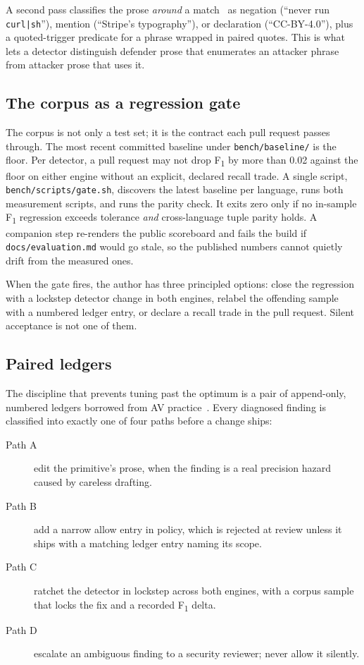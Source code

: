 A second pass classifies the prose \emph{around} a
match~\cite{primitivehub:2026:adr-0036} as negation (``never run
\texttt{curl|sh}''), mention (``Stripe's typography''), or declaration
(``CC-BY-4.0''), plus a quoted-trigger predicate for a phrase wrapped in
paired quotes. This is what lets a detector distinguish defender prose
that enumerates an attacker phrase from attacker prose that uses it.

\subsection{The corpus as a regression gate}

The corpus is not only a test set; it is the contract each pull request
passes through. The most recent committed baseline under
\texttt{bench/baseline/} is the floor. Per detector, a pull request may
not drop F\textsubscript{1} by more than 0.02 against the floor on
either engine without an explicit, declared recall trade. A single
script, \texttt{bench/scripts/gate.sh}, discovers the latest baseline
per language, runs both measurement scripts, and runs the parity check.
It exits zero only if no in-sample F\textsubscript{1} regression exceeds
tolerance \emph{and} cross-language tuple parity holds. A companion step
re-renders the public scoreboard and fails the build if
\texttt{docs/evaluation.md} would go stale, so the published numbers
cannot quietly drift from the measured ones.

When the gate fires, the author has three principled options: close the
regression with a lockstep detector change in both engines, relabel the
offending sample with a numbered ledger entry, or declare a recall
trade in the pull request. Silent acceptance is not one of them.

\subsection{Paired ledgers}

The discipline that prevents tuning past the optimum is a pair of
append-only, numbered ledgers borrowed from AV
practice~\cite{Christodorescu:2003:static-malware}. Every
diagnosed finding is classified into exactly one of four paths before a
change ships:

\begin{description}
  \item[Path A] edit the primitive's prose, when the finding is a real
    precision hazard caused by careless drafting.
  \item[Path B] add a narrow allow entry in policy, which is rejected at
    review unless it ships with a matching ledger entry naming its
    scope.
  \item[Path C] ratchet the detector in lockstep across both engines,
    with a corpus sample that locks the fix and a recorded
    F\textsubscript{1} delta.
  \item[Path D] escalate an ambiguous finding to a security reviewer;
    never allow it silently.
\end{description}

